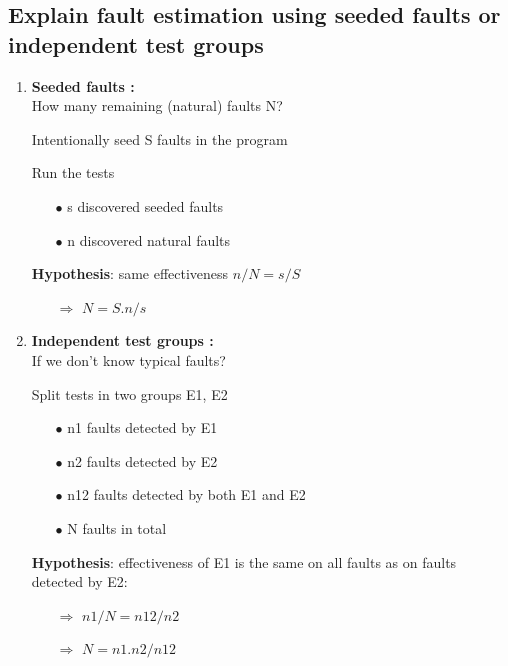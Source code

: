 \documentclass{article}
\begin{document}
\subsection{Explain fault estimation using seeded faults or independent test groups}

\vspace{-0.5cm}
\begin{multicols}{2}

\begin{enumerate}
    \item\textbf{Seeded faults :}\\
    How many remaining (natural) faults N?

Intentionally seed S faults in the program

Run the tests
\begin{itemize}
    \item[$\bullet$] s discovered seeded faults
    \item[$\bullet$] n discovered natural faults
\end{itemize}

\textbf{Hypothesis}: same effectiveness $n/N = s/S$
\begin{itemize}
    \item [$\Rightarrow$]$N = S . n /s$\\
\end{itemize}

    
    \vfill\null\columnbreak
    \item \textbf{Independent test groups :}\\
If we don’t know typical faults?

Split tests in two groups E1, E2
\begin{itemize}
    \item[$\bullet$] n1 faults detected by E1
    \item[$\bullet$] n2 faults detected by E2
    \item[$\bullet$] n12 faults detected by both E1 and E2

    \item[$\bullet$] N faults in total
\end{itemize}





\textbf{Hypothesis}: effectiveness of E1 is the same on all faults as on faults detected by E2:
    \begin{itemize}
        \item [$\Rightarrow$]$n1/N = n12/n2 $
        \item [$\Rightarrow$]$N = n1 . n2 / n12$
    \end{itemize}
\end{enumerate}


\end{multicols}
\end{document}
